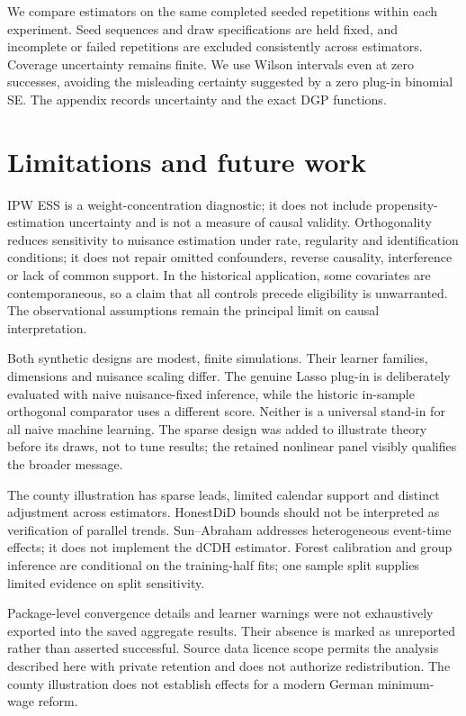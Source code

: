 We compare estimators on the same \Replications{} completed seeded repetitions within each experiment. Seed sequences and draw specifications are held fixed, and incomplete or failed repetitions are excluded consistently across estimators. Coverage uncertainty remains finite. We use Wilson intervals even at zero successes, avoiding the misleading certainty suggested by a zero plug-in binomial SE. The appendix records uncertainty and the exact DGP functions.
\section{Limitations and future work}
IPW ESS is a weight-concentration diagnostic; it does not include propensity-estimation uncertainty and is not a measure of causal validity.
Orthogonality reduces sensitivity to nuisance estimation under rate, regularity and identification conditions; it does not repair omitted confounders, reverse causality, interference or lack of common support. In the historical application, some covariates are contemporaneous, so a claim that all controls precede eligibility is unwarranted. The observational assumptions remain the principal limit on causal interpretation.

Both synthetic designs are modest, finite simulations. Their learner families, dimensions and nuisance scaling differ. The genuine Lasso plug-in is deliberately evaluated with naive nuisance-fixed inference, while the historic in-sample orthogonal comparator uses a different score. Neither is a universal stand-in for all naive machine learning. The sparse design was added to illustrate theory before its draws, not to tune results; the retained nonlinear panel visibly qualifies the broader message.

The county illustration has sparse leads, limited calendar support and distinct adjustment across estimators. HonestDiD bounds should not be interpreted as verification of parallel trends. Sun--Abraham addresses heterogeneous event-time effects; it does not implement the dCDH estimator. Forest calibration and group inference are conditional on the training-half fits; one sample split supplies limited evidence on split sensitivity.

Package-level convergence details and learner warnings were not exhaustively exported into the saved aggregate results. Their absence is marked as unreported rather than asserted successful. Source data licence scope permits the analysis described here with private retention and does not authorize redistribution. The county illustration does not establish effects for a modern German minimum-wage reform.
